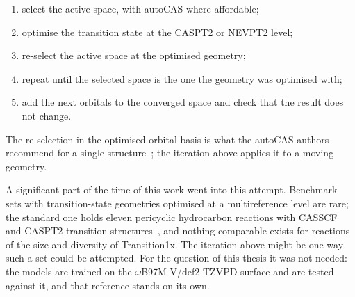 \begin{enumerate}
  \item select the active space, with autoCAS where affordable;
  \item optimise the transition state at the CASPT2 or NEVPT2 level;
  \item re-select the active space at the optimised geometry;
  \item repeat until the selected space is the one the geometry was
    optimised with;
  \item add the next orbitals to the converged space and check that the
    result does not change.
\end{enumerate}

The re-selection in the optimised orbital basis is what the autoCAS
authors recommend for a single structure~\cite{stein2019autocas}; the
iteration above applies it to a moving geometry.

A significant part of the time of this work went into this attempt.
Benchmark sets with transition-state geometries optimised at a
multireference level are rare; the standard one holds eleven
pericyclic hydrocarbon reactions with CASSCF and CASPT2 transition
structures~\cite{guner2003}, and nothing comparable exists for
reactions of the size and diversity of Transition1x. The iteration
above might be one way such a set could be attempted. For the question
of this thesis it was not needed: the models are trained on the \mbox{$\omega$B97M-V/def2-TZVPD}
surface and are tested against it, and that reference stands on its
own.

